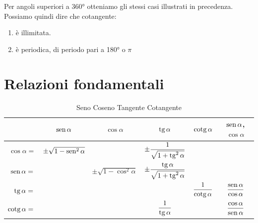 Per angoli superiori a \ang{360} otteniamo gli stessi casi illustrati in precedenza. 
Possiamo quindi dire che cotangente:
\begin{enumerate}
	\item è illimitata.
	\item è periodica, di periodo pari a \ang{180} o $\pi$
\end{enumerate} 
\begin{figure}
	\centering
	
	\label{fig:AndamentoCotangente1}
\end{figure}%
\begin{figure}
	\centering
	
	\label{fig:AndamentoCotangente2}
\end{figure}%


\section{Relazioni fondamentali}
\label{sec:RelazioniFondamentali}
\begin{table}[tbp]
	\centering
	\renewcommand{\arraystretch}{2}
	\begin{tabular}{rccccc}
	\toprule
	& $\operatorname{sen}\alpha$ &$\cos\alpha$&$\operatorname{tg}\alpha$ &$\operatorname{cotg}\alpha$ & $\operatorname{sen}\alpha$, $\cos\alpha$ \\[.6cm]
	\midrule
	$\cos\alpha={}$& $\pm\sqrt{1-\operatorname{sen}^2\alpha}$ & &$\pm\dfrac{1}{\sqrt{1+\operatorname{tg}^2\alpha}}$ & & \\ [.6cm]
	$\operatorname{sen}\alpha={}$& & $\pm\sqrt{1-\cos^2\alpha}$ &$\pm\dfrac{\operatorname{tg}\alpha}{\sqrt{1+\operatorname{tg}^2\alpha}}$ & & \\ [.6cm]
	$\operatorname{tg}\alpha={}$& & & & $\dfrac{1}{\operatorname{cotg}\alpha}$ &$\dfrac{\operatorname{sen}\alpha}{\cos\alpha}$\\ [.6cm]
	$\operatorname{cotg}\alpha={}$& & &$\dfrac{1}{\operatorname{tg}\alpha}$ & &$\dfrac{\cos\alpha}{\operatorname{sen}\alpha}$\\[.6cm] 
	\bottomrule
	\end{tabular}
	\caption{Seno Coseno Tangente Cotangente}
	\label{tab:SenoCosenoTangenteCotangente}
\end{table}
\renewcommand{\arraystretch}{1}

